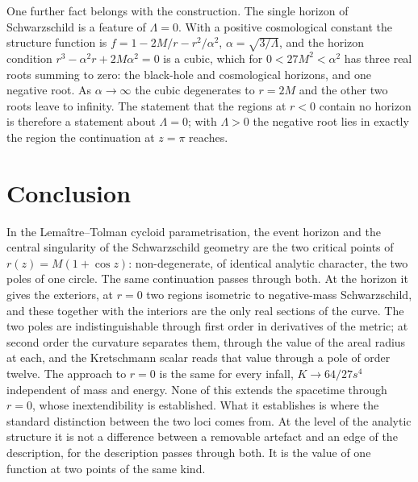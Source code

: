 \documentclass{iopjournal}
\theoremstyle{plain}
\theoremstyle{remark}
\begin{document}
One further fact belongs with the construction. The single horizon of Schwarzschild is a feature of $\Lambda=0$. With a positive cosmological constant the structure function is $f=1-2M/r-r^{2}/\alpha^{2}$, $\alpha=\sqrt{3/\Lambda}$, and the horizon condition $r^{3}-\alpha^{2}r+2M\alpha^{2}=0$ is a cubic, which for $0<27M^{2}<\alpha^{2}$ has three real roots summing to zero: the black-hole and cosmological horizons, and one negative root. As $\alpha\to\infty$ the cubic degenerates to $r=2M$ and the other two roots leave to infinity. The statement that the regions at $r<0$ contain no horizon is therefore a statement about $\Lambda=0$; with $\Lambda>0$ the negative root lies in exactly the region the continuation at $z=\pi$ reaches.

\section{Conclusion}\label{sec:conclusion}

In the Lemaître--Tolman cycloid parametrisation, the event horizon and the central singularity of the Schwarzschild geometry are the two critical points of $r(z)=M(1+\cos z)$: non-degenerate, of identical analytic character, the two poles of one circle. The same continuation passes through both. At the horizon it gives the exteriors, at $r=0$ two regions isometric to negative-mass Schwarzschild, and these together with the interiors are the only real sections of the curve. The two poles are indistinguishable through first order in derivatives of the metric; at second order the curvature separates them, through the value of the areal radius at each, and the Kretschmann scalar reads that value through a pole of order twelve. The approach to $r=0$ is the same for every infall, $K\to64/27s^{4}$ independent of mass and energy. None of this extends the spacetime through $r=0$, whose inextendibility is established. What it establishes is where the standard distinction between the two loci comes from. At the level of the analytic structure it is not a difference between a removable artefact and an edge of the description, for the description passes through both. It is the value of one function at two points of the same kind.




\end{document}
